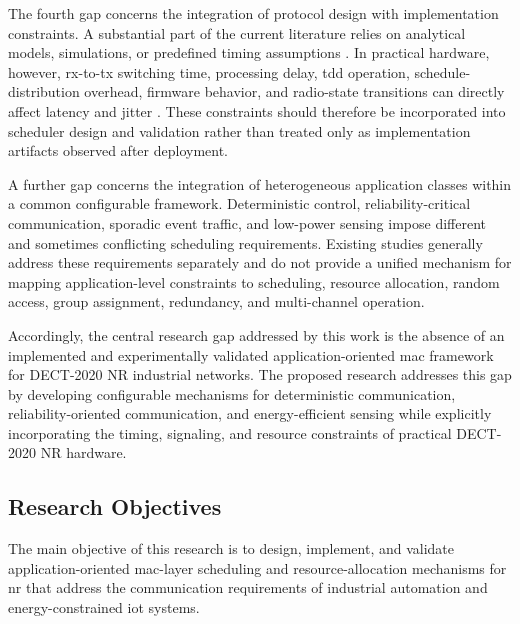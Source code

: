 \documentclass[12pt,a4paper]{article}
\begin{document}
The fourth gap concerns the integration of protocol design with implementation constraints. A substantial part of the current literature relies on analytical models, simulations, or predefined timing assumptions
\cite{dhanwaniAssessmentCandidateTechnology2020,
anttonenEnablingMassiveMachine2021a,
pennerURLLCPerformanceEvaluation2021}.
In practical hardware, however, \gls{rx}-to-\gls{tx} switching time, processing delay, \gls{tdd} operation, schedule-distribution overhead, firmware behavior, and radio-state transitions can directly affect latency and jitter
\cite{wassmannPerformanceDECT2020NR2024,
haqueDECT2020NRLink2025,
grafWhatExpectWhen2026}.
These constraints should therefore be incorporated into scheduler design and validation rather than treated only as implementation artifacts observed after deployment.

A further gap concerns the integration of heterogeneous application classes within a common configurable framework. Deterministic control, reliability-critical communication, sporadic event traffic, and low-power sensing impose different and sometimes conflicting scheduling requirements. Existing studies generally address these requirements separately and do not provide a unified mechanism for mapping application-level constraints to scheduling, resource allocation, random access, group assignment, redundancy, and multi-channel operation.

Accordingly, the central research gap addressed by this work is the absence of an implemented and experimentally validated application-oriented \gls{mac} framework for DECT-2020 NR industrial networks. The proposed research addresses this gap by developing configurable mechanisms for deterministic communication, reliability-oriented communication, and energy-efficient sensing while explicitly incorporating the timing, signaling, and resource constraints of practical DECT-2020 NR hardware.


\subsection{Research Objectives}

The main objective of this research is to design, implement, and validate application-oriented \gls{mac}-layer scheduling and resource-allocation mechanisms for \gls{nr} that address the communication requirements of industrial automation and energy-constrained \gls{iot} systems.
\end{document}
